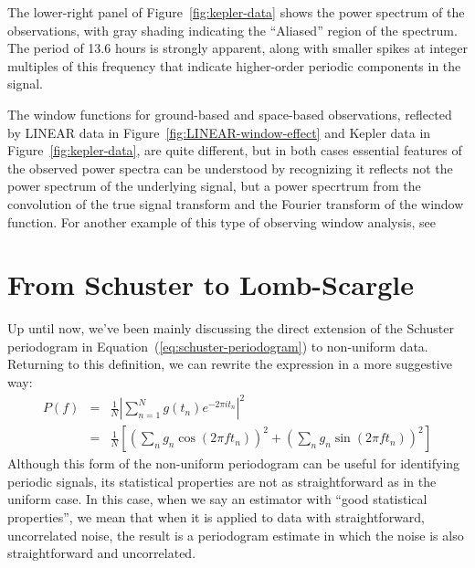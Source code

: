\documentclass[preprint]{aastex}
\newcommand{\fig}[1]{Figure~\ref{fig:#1}}
\newcommand{\Eq}[1]{Equation~(\ref{eq:#1})}
\newcommand{\eq}[1]{\Eq{#1}}
\newcommand{\eqlabel}[1]{\label{eq:#1}}
\begin{document}
The lower-right panel of \fig{kepler-data} shows the power spectrum of the
observations, with gray shading indicating the ``Aliased'' region of the
spectrum.
The period of 13.6 hours is strongly apparent, along with smaller spikes at
integer multiples of this frequency that indicate higher-order periodic
components in the signal.

The window functions for ground-based and space-based observations, reflected
by LINEAR data in \fig{LINEAR-window-effect} and Kepler data in
\fig{kepler-data}, are quite different, but in both cases essential features
of the observed power spectra can be understood by recognizing it reflects
not the power spectrum of the underlying signal, but a power specrtrum from
the convolution of the true signal transform and the Fourier transform of
the window function.
For another example of this type of observing window analysis, see
\citep{Deeming75}


\section{From Schuster to Lomb-Scargle}

Up until now, we've been mainly discussing the direct extension of the Schuster
periodogram in \eq{schuster-periodogram} to non-uniform data.
Returning to this definition, we can rewrite the expression in a more
suggestive way:
\begin{eqnarray}
  P(f)
  &=& \frac{1}{N}\left|\sum_{n=1}^N g(t_n)e^{-2\pi i t_n} \right|^2 \nonumber\\
  &=& \frac{1}{N}\left[
    \left(\sum_n g_n \cos(2\pi f t_n)\right)^2
    + \left(\sum_n g_n \sin(2\pi f t_n)\right)^2
    \right]
  \eqlabel{classical-periodogram}
\end{eqnarray}
Although this form of the non-uniform periodogram can be useful for identifying
periodic signals, its statistical properties are not as straightforward as in
the uniform case.
In this case, when we say an estimator with ``good statistical properties'',
we mean that when it is applied to data with straightforward, uncorrelated
noise, the result is a periodogram estimate in which the noise is also
straightforward and uncorrelated.
\end{document}
